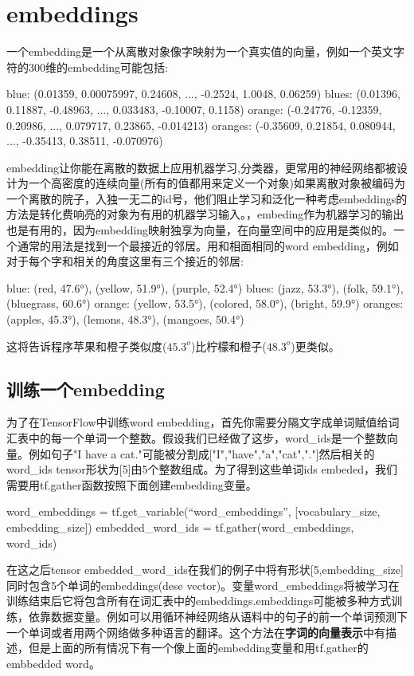 \section{embeddings}
一个embedding是一个从离散对象像字映射为一个真实值的向量，例如一个英文字符的300维的embedding可能包括:
\begin{python}
blue:  (0.01359, 0.00075997, 0.24608, ..., -0.2524, 1.0048, 0.06259)
blues:  (0.01396, 0.11887, -0.48963, ..., 0.033483, -0.10007, 0.1158)
orange:  (-0.24776, -0.12359, 0.20986, ..., 0.079717, 0.23865, -0.014213)
oranges:  (-0.35609, 0.21854, 0.080944, ..., -0.35413, 0.38511, -0.070976)
\end{python}
embedding让你能在离散的数据上应用机器学习,分类器，更常用的神经网络都被设计为一个高密度的连续向量(所有的值都用来定义一个对象)如果离散对象被编码为一个离散的院子，入独一无二的id号，他们阻止学习和泛化一种考虑embeddings的方法是转化费响亮的对象为有用的机器学习输入。，embeding作为机器学习的输出也是有用的，因为embedding映射独享为向量，在向量空间中的应用是类似的。一个通常的用法是找到一个最接近的邻居。用和相面相同的word embedding，例如对于每个字和相关的角度这里有三个接近的邻居:
\begin{python}
blue:  (red, 47.6°), (yellow, 51.9°), (purple, 52.4°)
blues:  (jazz, 53.3°), (folk, 59.1°), (bluegrass, 60.6°)
orange:  (yellow, 53.5°), (colored, 58.0°), (bright, 59.9°)
oranges:  (apples, 45.3°), (lemons, 48.3°), (mangoes, 50.4°)
\end{python}
这将告诉程序苹果和橙子类似度($45.3^o$)比柠檬和橙子($48.3^o$)更类似。
\subsection{训练一个embedding}
为了在TensorFlow中训练word embedding，首先你需要分隔文字成单词赋值给词汇表中的每一个单词一个整数。假设我们已经做了这步，word\_ids是一个整数向量。例如句子"I have a cat."可能被分割成["I","have","a","cat","."]然后相关的word\_ids tensor形状为[5]由5个整数组成。为了得到这些单词ids embeded，我们需要用tf.gather函数按照下面创建embedding变量。
\begin{python}
word_embeddings = tf.get_variable(“word_embeddings”,
    [vocabulary_size, embedding_size])
embedded_word_ids = tf.gather(word_embeddings, word_ids)
\end{python}
在这之后tensor embedded\_word\_ids在我们的例子中将有形状[5,embedding\_size]同时包含5个单词的embeddings(dese vector)。变量word\_embeddings将被学习在训练结束后它将包含所有在词汇表中的embeddings.embeddings可能被多种方式训练，依靠数据变量。例如可以用循环神经网络从语料中的句子的前一个单词预测下一个单词或者用两个网络做多种语言的翻译。这个方法在\textbf{字词的向量表示}中有描述，但是上面的所有情况下有一个像上面的embedding变量和用tf.gather的embbedded word。
